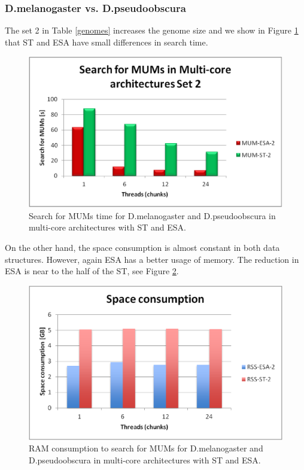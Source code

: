 \documentclass[runningheads,a4paper]{llncs}
\begin{document}
\subsubsection{D.melanogaster vs. D.pseudoobscura}
The set 2 in Table \ref{genomes} increases the genome size and we show in Figure \ref{fig:fly-mum} that ST and ESA have small differences in search time.
\begin{figure}[h]
  \centering
  \includegraphics[scale=0.3]{fly-MUM.eps}
  \caption{Search for MUMs time for D.melanogaster and D.pseudoobscura in multi-core architectures with ST and ESA.}
  \label{fig:fly-mum}
\end{figure}  
On the other hand, the space consumption is almost constant in both data structures. However, again ESA has a better usage of memory. The reduction in ESA is near to the half of the ST, see Figure \ref{fig:fly-ram}.
\begin{figure}[h]
  \centering
  \includegraphics[scale=0.65]{fly-RAM.eps}
  \caption{RAM consumption to search for MUMs for D.melanogaster and D.pseudoobscura in multi-core architectures with ST and ESA.}
  \label{fig:fly-ram}
\end{figure}  
\end{document}
